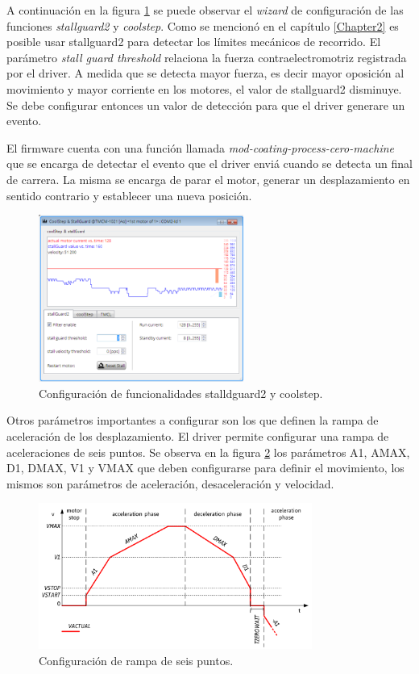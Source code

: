 A continuación en la figura \ref{fig:tmcl_ide_stall} se puede observar el \textit{wizard} de configuración de las funciones \textit{stallguard2} y \textit{coolstep}.
Como se mencionó en el capítulo \ref{Chapter2} es posible usar stallguard2 para detectar los límites mecánicos de recorrido. El parámetro \textit{stall guard threshold} relaciona la fuerza contraelectromotriz registrada por el driver. A medida que se detecta mayor fuerza, es decir mayor oposición al movimiento y mayor corriente en los motores, el valor de stallguard2 disminuye. Se debe configurar entonces un valor de detección para que el driver generare un evento.

El firmware cuenta con una función llamada \textit{mod-coating-process-cero-machine} que se encarga de detectar el evento que el driver enviá cuando se detecta un final de carrera. La misma se encarga de parar el motor, generar un desplazamiento en sentido contrario y establecer una nueva posición.

  

\begin{figure}[h!]
	\centering
	\includegraphics[width=0.6\textwidth]{./Figures/tmcl_ide_2.png}
	\caption{Configuración de funcionalidades stalldguard2 y coolstep.}
	\label{fig:tmcl_ide_stall}
\end{figure}

Otros parámetros importantes a configurar son los que definen la rampa de aceleración de los desplazamiento. 
El driver permite configurar una rampa de aceleraciones de seis puntos.
Se observa en la figura \ref{fig:rampa} los parámetros A1, AMAX, D1, DMAX, V1 y VMAX que deben configurarse para definir el movimiento, los mismos son parámetros de aceleración, desaceleración y velocidad.



\begin{figure}[h!]
	\centering
	\includegraphics[width=0.8\textwidth]{./Figures/rampa_1.png}
	\caption{Configuración de rampa de seis puntos.}
	\label{fig:rampa}
\end{figure}


